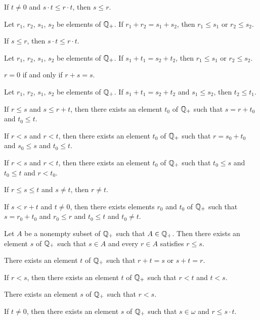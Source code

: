\documentclass{article}
\begin{document}
\begin{thm}
\item\label{arytm3:80} If $t\neq0$ and $s\cdot t\leq r\cdot t$, then
  $s\leq r$.
\item\label{arytm3:81} Let $r_{1}$, $r_{2}$, $s_{1}$, $s_{2}$ be
  elements of $\mathbb{Q}_{+}$. If $r_{1}+r_{2}=s_{1}+s_{2}$, then $r_{1}\leq s_{1}$
  or $r_{2}\leq s_{2}$.
\item\label{arytm3:82} If $s\leq r$, then $s\cdot t\leq r\cdot t$.
\item\label{arytm3:83} Let $r_{1}$, $r_{2}$, $s_{1}$, $s_{2}$ be
  elements of $\mathbb{Q}_{+}$. If $s_{1}+t_{1}=s_{2}+t_{2}$, then $r_{1}\leq s_{1}$
  or $r_{2}\leq s_{2}$.
\item\label{arytm3:84} $r=0$ if and only if $r+s=s$.
\item\label{arytm3:85} Let $r_{1}$, $r_{2}$, $s_{1}$, $s_{2}$ be
  elements of $\mathbb{Q}_{+}$. If $s_{1}+t_{1}=s_{2}+t_{2}$ and $s_{1}\leq s_{2}$,
  then $t_{2}\leq t_{1}$.
\item\label{arytm3:86} If $r\leq s$ and $s\leq r+t$, then there exists
  an element $t_{0}$ of $\mathbb{Q}_{+}$ such that $s=r+t_{0}$ and $t_{0}\leq t$.
\item\label{arytm3:87} If $r<s$ and $r<t$, then there exists
  an element $t_{0}$ of $\mathbb{Q}_{+}$ such that $r=s_{0}+t_{0}$ and
  $s_{0}\leq s$ and $t_{0}\leq t$.
\item\label{arytm3:88} If $r<s$ and $r<t$, then there exists
  an element $t_{0}$ of $\mathbb{Q}_{+}$ such that $t_{0}\leq s$ and $t_{0}\leq t$
  and $r<t_{0}$.
\item\label{arytm3:89} If $r\leq s\leq t$ and $s\neq t$, then $r\neq t$.
\item\label{arytm3:90} If $s<r+t$ and $t\neq0$, then there exists
  elements $r_{0}$ and $t_{0}$ of $\mathbb{Q}_{+}$ such that $s=r_{0}+t_{0}$
  and $r_{0}\leq r$ and $t_{0}\leq t$ and $t_{0}\neq t$.
\item\label{arytm3:91} Let $A$ be a nonempty subset of $\mathbb{Q}_{+}$ such
  that $A\in\mathbb{Q}_{+}$. Then there exists an element $s$ of $\mathbb{Q}_{+}$ such
  that $s\in A$ and every $r\in A$ satisfies $r\leq s$.
\item\label{arytm3:92} There exists an element $t$ of $\mathbb{Q}_{+}$ such
  that $r+t=s$ or $s+t=r$.
\item\label{arytm3:93} If $r<s$, then there exists an element $t$ of $\mathbb{Q}_{+}$
  such that $r<t$ and $t<s$.
\item\label{arytm3:94} There exists an element $s$ of $\mathbb{Q}_{+}$ such
  that $r<s$.
\item\label{arytm3:95} If $t\neq0$, then there exists an element $s$ of
  $\mathbb{Q}_{+}$ such that $s\in\omega$ and $r\leq s\cdot t$.
\end{thm}
\end{document}

